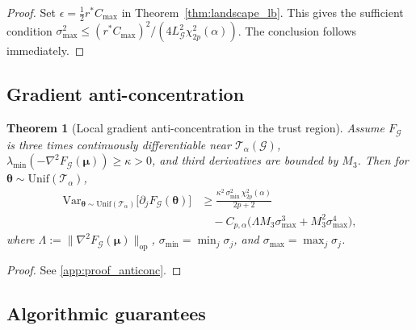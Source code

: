 \documentclass[aps,prx,reprint,superscriptaddress,longbibliography]{revtex4-2}
\newcommand{\calG}{\mathcal{G}}
\newcommand{\calT}{\mathcal{T}}
\newtheorem{theorem}{Theorem}
\begin{document}
\begin{proof}
Set $\epsilon = \tfrac{1}{2}r^* C_{\max}$ in
Theorem~\ref{thm:landscape_lb}. This gives the sufficient condition
$\sigma_{\max}^2 \le (r^* C_{\max})^2 /
(4 L_\calG^2 \chi^2_{2p}(\alpha))$.
The conclusion follows immediately.
\end{proof}

\subsection{Gradient anti-concentration}

\begin{theorem}[Local gradient anti-concentration in the trust region]
\label{thm:anticoncentration}
Assume $F_\calG$ is three times continuously differentiable near
$\calT_\alpha(\calG)$,
$\lambda_{\min}(-\nabla^2 F_\calG(\bm\mu)) \ge \kappa > 0$,
and third derivatives are bounded by $M_3$.
Then for $\bm\theta \sim \mathrm{Unif}(\calT_\alpha)$,
\begin{equation}
    \begin{aligned}
    \mathrm{Var}_{\bm\theta \sim \mathrm{Unif}(\calT_\alpha)}
    \bigl[\partial_j F_\calG(\bm\theta)\bigr]
    &\ge \frac{\kappa^2\, \sigma_{\min}^2\, \chi^2_{2p}(\alpha)}
    {2p+2} \\
    &\quad - C_{p,\alpha}\bigl(\Lambda M_3\sigma_{\max}^3
    + M_3^2\sigma_{\max}^4\bigr),
    \end{aligned}
    \label{eq:anticoncentration}
\end{equation}
where $\Lambda := \|\nabla^2 F_\calG(\bm\mu)\|_{\mathrm{op}}$,
$\sigma_{\min} = \min_j \sigma_j$, and
$\sigma_{\max} = \max_j \sigma_j$.
\end{theorem}

\begin{proof}
See \cref{app:proof_anticonc}.
\end{proof}

\subsection{Algorithmic guarantees}
\end{document}
